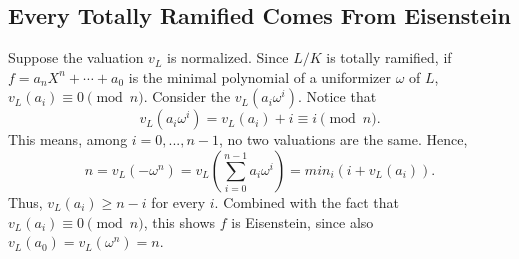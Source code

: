 \documentclass[12pt]{amsart}
\theoremstyle{named}
\begin{document}
\subsection{Every Totally Ramified Comes From Eisenstein} Suppose the valuation $v_L$ is normalized.
Since $L/K$ is totally ramified, if $f = a_n X^n + \cdots + a_0$ is the minimal polynomial of a
uniformizer $\omega$ of $L$, $v_L(a_i) \equiv 0 \pmod n$. Consider the $v_L(a_i \omega^i)$.
Notice that \[v_L(a_i \omega^i) = v_L(a_i) + i \equiv i \pmod n.\] This means, among
$i = 0, ..., n - 1$, no two valuations are the same. Hence,
\[n = v_L(-\omega^n) = v_L(\sum_{i = 0}^{n - 1} a_i \omega^i) = min_i (i + v_L(a_i)).\]
Thus, $v_L(a_i) \geq n - i$ for every $i$. Combined with the fact that $v_L(a_i) \equiv 0 \pmod n$,
this shows $f$ is Eisenstein, since also $v_L(a_0) = v_L(\omega^n) = n$.
\end{document}
